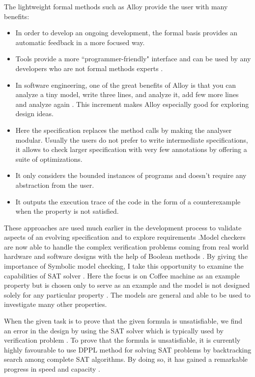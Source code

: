 \documentclass[a4paper,12pt]{report}
\begin{document}
\begin{onehalfspacing}
The lightweight formal methods such as Alloy provide the user with many benefits:
\begin{itemize}
\item {In order to develop an ongoing development, the formal basis provides an automatic feedback in a more focused way.}
\item {Tools provide a more ``programmer-friendly" interface and can be used by any developers who are not formal methods experts} \cite{A.Blandford2000}.
\item {In software engineering, one of the great benefits of Alloy is that you can analyze a tiny model, write three lines, and analyze it, add few more lines and analyze again \cite{ErichGamma1995}. This increment makes Alloy especially good for exploring design ideas. }
\item {Here the specification replaces the method calls by making the analyser modular. Usually the users do not prefer to write intermediate specifications, it allows to check larger specification with very few annotations by offering a suite of optimizations.}
\item {It only considers the bounded instances of programs and  doesn't require any abstraction from the user.}
\item {It outputs the execution trace of the code in the form of a counterexample when the property is not satisfied.}

\end{itemize}

These approaches are used much earlier in the development process to validate aspects of an evolving specification and to explore requirements \cite{Hoare1986}.Model checkers are now able to handle the complex verification problems coming from real world hardware and software designs with the help of Boolean methods \cite{ErichGamma1995}. By giving the importance of Symbolic model checking, I take this opportunity to examine the capabilities of SAT solver \cite{R.Bryant1986}. Here the focus is on Coffee machine as an example property but is chosen only to serve as an example and the model is not designed solely for any particular property \cite{ErichGamma1995}. The models are general and able to be used to investigate many other properties.

When the given task is to prove that the given formula is unsatisfiable, we find an error in the design by using the SAT solver which is typically used by verification problem \cite{McMillan2003}. To prove that the formula is unsatisfiable, it is currently highly favourable to use DPPL method \cite{M.Davis1962} for solving SAT problems by backtracking search among complete SAT algorithms. By doing so, it has gained a remarkable progress in speed and capacity \cite{M.Moskewicz2001}.


\end{onehalfspacing}
\end{document}
